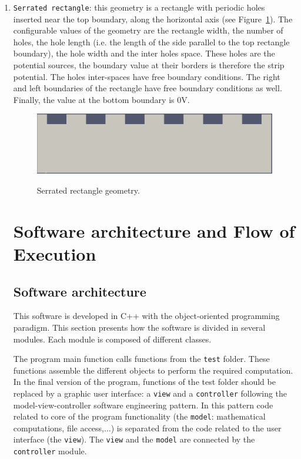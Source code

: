\documentclass[11pt]{article}
\begin{document}
\begin{enumerate}
\item \texttt{Serrated rectangle}: this geometry is a rectangle with periodic
holes inserted near the top boundary, along the horizontal axis
(see Figure~\ref{fig:serrated_rect_geometry}).
The configurable values of the geometry are the rectangle width, the number
of holes, the hole length (i.e. the length of the side parallel to the top
rectangle boundary), the hole width and the inter holes space.
These holes are the potential sources, the boundary value at their borders is therefore
the strip potential. The holes inter-spaces have free boundary conditions.
The right and left boundaries of the rectangle have free boundary conditions as well.
Finally, the value at the bottom boundary is 0V.

\begin{figure}[H]
  \center
  \includegraphics[scale=0.2]{images/serrated_rect_geometry.png}
  \label{fig:serrated_rect_geometry}
  \caption{Serrated rectangle geometry.}
\end{figure}

\section{Software architecture and Flow of Execution}

\subsection{Software architecture}

This software is developed in C++ with the object-oriented programming paradigm.
This section presents how the software is divided in several modules. Each module
is composed of different classes.

The program main function calls functions from the \texttt{test} folder. These functions
assemble the different objects to perform the required computation. In the
final version of the program, functions of the test folder should be replaced
by a graphic user interface: a \texttt{view} and a \texttt{controller} following
the model-view-controller software engineering pattern. In this pattern code
related to core of the program functionality (the \texttt{model}: mathematical computations, file access,...)
is separated from the code related to the user interface (the \texttt{view}).
The \texttt{view} and the
\texttt{model} are connected by the \texttt{controller} module.


\end{enumerate}
\end{document}
